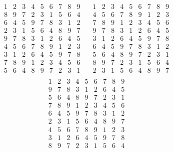 \documentclass{article}
\begin{document}
\begin{figure}

  \begin{center}

\[
  \begin{array}{ccc|ccc|ccc}
1 & 2 & 3 & 4 & 5 & 6 & 7 & 8 & 9 \\
8 & 9 & 7 & 2 & 3 & 1 & 5 & 6 & 4 \\
6 & 4 & 5 & 9 & 7 & 8 & 3 & 1 & 2 \\
\hline
2 & 3 & 1 & 5 & 6 & 4 & 8 & 9 & 7 \\
9 & 7 & 8 & 3 & 1 & 2 & 6 & 4 & 5 \\
4 & 5 & 6 & 7 & 8 & 9 & 1 & 2 & 3 \\
\hline
3 & 1 & 2 & 6 & 4 & 5 & 9 & 7 & 8 \\
7 & 8 & 9 & 1 & 2 & 3 & 4 & 5 & 6 \\
5 & 6 & 4 & 8 & 9 & 7 & 2 & 3 & 1 \\
\end{array}\quad\begin{array}{ccc|ccc|ccc}
1 & 2 & 3 & 4 & 5 & 6 & 7 & 8 & 9 \\
4 & 5 & 6 & 7 & 8 & 9 & 1 & 2 & 3 \\
7 & 8 & 9 & 1 & 2 & 3 & 4 & 5 & 6 \\
\hline
9 & 7 & 8 & 3 & 1 & 2 & 6 & 4 & 5 \\
3 & 1 & 2 & 6 & 4 & 5 & 9 & 7 & 8 \\
6 & 4 & 5 & 9 & 7 & 8 & 3 & 1 & 2 \\
\hline
5 & 6 & 4 & 8 & 9 & 7 & 2 & 3 & 1 \\
8 & 9 & 7 & 2 & 3 & 1 & 5 & 6 & 4 \\
2 & 3 & 1 & 5 & 6 & 4 & 8 & 9 & 7 \\
            \end{array}\]
          \[\begin{array}{ccc|ccc|ccc}
1 & 2 & 3 & 4 & 5 & 6 & 7 & 8 & 9 \\
9 & 7 & 8 & 3 & 1 & 2 & 6 & 4 & 5 \\
5 & 6 & 4 & 8 & 9 & 7 & 2 & 3 & 1 \\
\hline
7 & 8 & 9 & 1 & 2 & 3 & 4 & 5 & 6 \\
6 & 4 & 5 & 9 & 7 & 8 & 3 & 1 & 2 \\
2 & 3 & 1 & 5 & 6 & 4 & 8 & 9 & 7 \\
\hline
4 & 5 & 6 & 7 & 8 & 9 & 1 & 2 & 3 \\
3 & 1 & 2 & 6 & 4 & 5 & 9 & 7 & 8 \\
  8 & 9 & 7 & 2 & 3 & 1 & 5 & 6 & 4 \\
\end{array}
\]


\end{center}
\end{figure}
\end{document}
